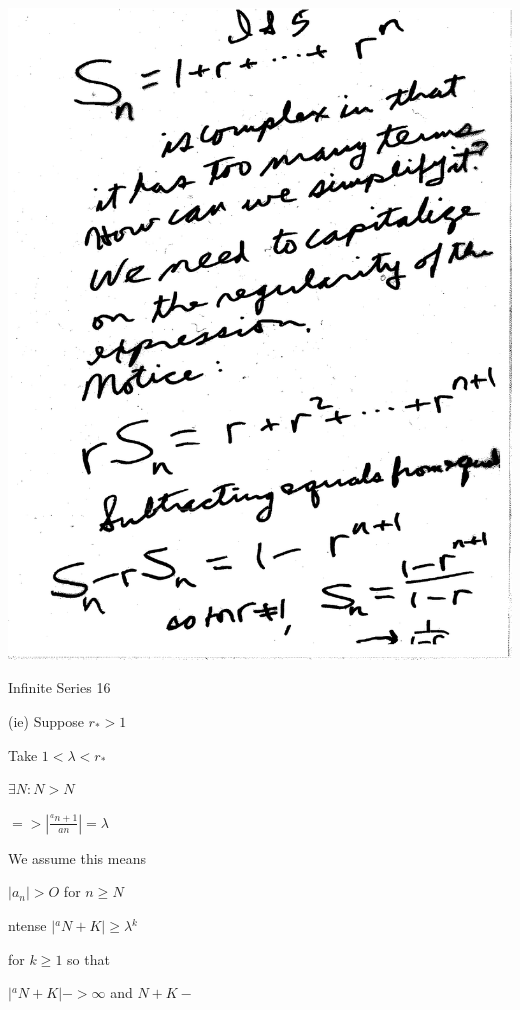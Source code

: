 \documentclass[10pt,a4paper]{article}
\begin{document}
{{\includegraphics[scale=.5]{Pages/IS_5}



\newpage %

\begin{center}

{Infinite Series 16}

\end{center}

(ie) Suppose $r_{*} > 1$

Take $1 < \lambda < r_{*}$

$\exists N:N>N$

$=> |{\frac{{^a}n+1}{an}}| = \lambda$

We assume this means

$|a_{n}| > O$ for $n \geq N$

ntense $|{^a}N+K|\geq \lambda {^k}$

for $k\geq1$ so that

$|{^a}N+K|->\infty$ and $N+K-$

}}
\end{document}
